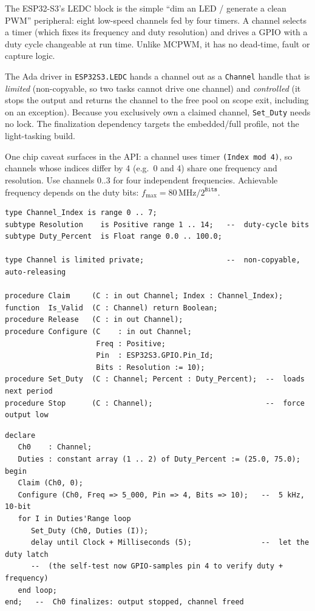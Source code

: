 The ESP32-S3's LEDC block is the simple ``dim an LED / generate a clean PWM''
peripheral: eight low-speed channels fed by four timers. A channel selects a
timer (which fixes its frequency and duty resolution) and drives a GPIO with a
duty cycle changeable at run time. Unlike MCPWM, it has no dead-time, fault or
capture logic.

The Ada driver in \texttt{ESP32S3.LEDC} hands a channel out as a \texttt{Channel}
handle that is \emph{limited} (non-copyable, so two tasks cannot drive one
channel) and \emph{controlled} (it stops the output and returns the channel to
the free pool on scope exit, including on an exception). Because you exclusively
own a claimed channel, \texttt{Set\_Duty} needs no lock. The finalization
dependency targets the embedded/full profile, not the light-tasking build.

One chip caveat surfaces in the API: a channel uses timer \texttt{(Index mod 4)},
so channels whose indices differ by 4 (e.g.\ 0 and 4) share one frequency and
resolution. Use channels 0..3 for four independent frequencies. Achievable
frequency depends on the duty bits: $f_{\max} = 80\,\mathrm{MHz} / 2^{\texttt{Bits}}$.

\begin{lstlisting}
type Channel_Index is range 0 .. 7;
subtype Resolution    is Positive range 1 .. 14;   --  duty-cycle bits
subtype Duty_Percent  is Float range 0.0 .. 100.0;

type Channel is limited private;                   --  non-copyable, auto-releasing

procedure Claim     (C : in out Channel; Index : Channel_Index);
function  Is_Valid  (C : Channel) return Boolean;
procedure Release   (C : in out Channel);
procedure Configure (C    : in out Channel;
                     Freq : Positive;
                     Pin  : ESP32S3.GPIO.Pin_Id;
                     Bits : Resolution := 10);
procedure Set_Duty  (C : Channel; Percent : Duty_Percent);  --  loads next period
procedure Stop      (C : Channel);                          --  force output low
\end{lstlisting}

\begin{lstlisting}
declare
   Ch0    : Channel;
   Duties : constant array (1 .. 2) of Duty_Percent := (25.0, 75.0);
begin
   Claim (Ch0, 0);
   Configure (Ch0, Freq => 5_000, Pin => 4, Bits => 10);   --  5 kHz, 10-bit
   for I in Duties'Range loop
      Set_Duty (Ch0, Duties (I));
      delay until Clock + Milliseconds (5);                --  let the duty latch
      --  (the self-test now GPIO-samples pin 4 to verify duty + frequency)
   end loop;
end;   --  Ch0 finalizes: output stopped, channel freed
\end{lstlisting}

